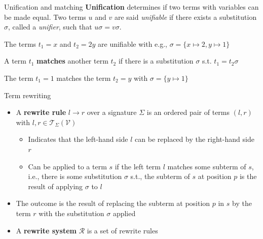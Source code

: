 \documentclass[11pt,aspectratio=169]{beamer}
\begin{document}
\begin{frame}[fragile]{Unification and matching}
    \textbf{Unification} determines if two terms with variables can be made 
    equal. Two terms $u$ and $v$ are said \textit{unifiable} if there exists a 
    substitution $\sigma$, called a \textit{unifier}, such that
    $u\sigma = v\sigma$.

    \begin{tcolorbox}[title=Example]
        The terms $t_1 = x$ and $t_2 = 2y$ are unifiable with e.g.,
        $\sigma = \{x \mapsto 2, y \mapsto 1\}$
    \end{tcolorbox}

    A term $t_1$ \textbf{matches} another term $t_2$ if there is a substitution 
    $\sigma$ s.t. $t_1 = t_2\sigma$

    \begin{tcolorbox}[title=Example]
        The term $t_1 = 1$ matches the term $t_2 = y$ with
        $\sigma = \{y \mapsto 1\}$
    \end{tcolorbox}
\end{frame}

\begin{frame}[fragile]{Term rewriting}
    \begin{itemize}
        \item A \textbf{rewrite rule} $l \rightarrow r$ over a signature 
              $\Sigma$ is an ordered pair of terms $(l, r)$ with
              $l,r \in \mathcal{T}_{\Sigma}(\mathcal{V})$
        \begin{itemize}
            \item Indicates that the left-hand side $l$ can be replaced by the 
                  right-hand side $r$
            \item Can be applied to a term $s$ if the left term $l$ matches 
                  some subterm of $s$, i.e., there is some substitution 
                  $\sigma$ s.t., the subterm of $s$ at position $p$ is the 
                  result of applying $\sigma$ to $l$
        \end{itemize}
        \item The outcome is the result of replacing the subterm at position 
              $p$ in $s$ by the term $r$ with the substitution $\sigma$ applied
        \item A \textbf{rewrite system} $\mathcal{R}$ is a set of rewrite rules
    \end{itemize}
\end{frame}
\end{document}
